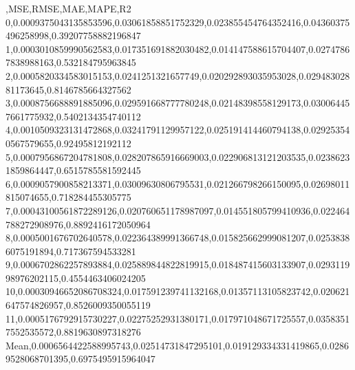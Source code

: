 ,MSE,RMSE,MAE,MAPE,R2
0,0.0009375043135853596,0.03061858851752329,0.023855454764352416,0.04360375496258998,0.39207758882196847
1,0.0003010859990562583,0.017351691882030482,0.014147588615704407,0.02747867838988163,0.532184795963845
2,0.0005820334583015153,0.0241251321657749,0.020292893035953028,0.02948302881173645,0.8146785664327562
3,0.0008756688891885096,0.029591668777780248,0.02148398558129173,0.030064457661775932,0.5402134354740112
4,0.0010509323131472868,0.03241791129957122,0.025191414460794138,0.029253540567579655,0.92495812192112
5,0.0007956867204781808,0.028207865916669003,0.022906813121203535,0.02386231859864447,0.6515785581592445
6,0.0009057900858213371,0.03009630806795531,0.021266798266150095,0.02698011815074655,0.718284455305775
7,0.00043100561872289126,0.020760651178987097,0.014551805799410936,0.022464788272908976,0.8892416172050964
8,0.0005001676702640578,0.022364389991366748,0.015825662999081207,0.02538386075191894,0.717367594533281
9,0.0006702862257893884,0.025889844822819915,0.018487415603133907,0.029311998976202115,0.4554463406024205
10,0.00030946652086708324,0.017591239741132168,0.01357113105823742,0.020621647574826957,0.8526009350055119
11,0.0005176792915730227,0.02275252931380171,0.017971048671725557,0.03583517552535572,0.8819630897318276
Mean,0.0006564422588995743,0.02514731847295101,0.019129334331419865,0.02869528068701395,0.6975495915964047
